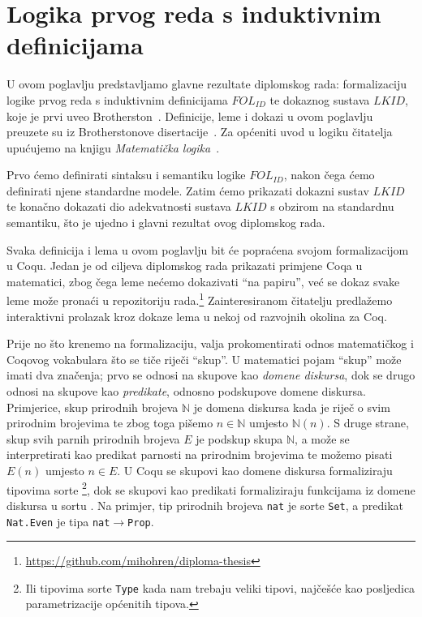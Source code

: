 \chapter{Logika prvog reda s induktivnim definicijama}\label{cha:logika-prvog-reda}
U ovom poglavlju predstavljamo glavne rezultate diplomskog rada: formalizaciju
logike prvog reda s induktivnim definicijama \(\mathit{FOL_{ID}}\)
te dokaznog sustava \(\mathit{LKID}\), koje je prvi uveo Brotherston~\cite{brotherston2005}.
Definicije, leme i dokazi u ovom poglavlju preuzete su iz Brotherstonove disertacije~\cite{brotherstonphd}.
Za općeniti uvod u logiku čitatelja upućujemo na knjigu \textit{Matematička logika}~\cite{vukovic}.

Prvo ćemo definirati sintaksu i semantiku logike \(\mathit{FOL_{ID}}\),
nakon čega ćemo definirati njene standardne modele.
Zatim ćemo prikazati dokazni sustav \(\mathit{LKID}\) te konačno dokazati dio adekvatnosti
sustava \(LKID\) s obzirom na standardnu semantiku,
što je ujedno i glavni rezultat ovog diplomskog rada.

Svaka definicija i lema u ovom poglavlju bit će popraćena svojom formalizacijom u Coqu.
Jedan je od ciljeva diplomskog rada prikazati primjene Coqa u matematici,
zbog čega leme nećemo dokazivati \enquote{na papiru},
već se dokaz svake leme može pronaći u repozitoriju rada.\footnote{\url{https://github.com/mihohren/diploma-thesis}}
Zainteresiranom čitatelju predlažemo interaktivni prolazak
kroz dokaze lema u nekoj od razvojnih okolina za Coq.

Prije no što krenemo na formalizaciju, valja prokomentirati odnos matematičkog i Coqovog vokabulara
što se tiče riječi \enquote{skup}.
U matematici pojam \enquote{skup} može imati dva značenja;
prvo se odnosi na skupove kao \textit{domene diskursa},
dok se drugo odnosi na skupove kao \textit{predikate}, odnosno podskupove domene diskursa.
Primjerice, skup prirodnih brojeva \(\mathbb{N}\) je domena diskursa kada je riječ o svim prirodnim brojevima
te zbog toga pišemo \(n \in \mathbb{N}\) umjesto \(\mathbb{N}(n)\).
S druge strane, skup svih parnih prirodnih brojeva \(E\) je podskup skupa \(\mathbb{N}\), a može se interpretirati
kao predikat parnosti na prirodnim brojevima te možemo pisati \(E(n)\) umjesto \(n \in E\).
U Coqu se skupovi kao domene diskursa formaliziraju tipovima sorte \coqset\footnote{Ili tipovima sorte \texttt{Type}
kada nam trebaju veliki tipovi, najčešće kao posljedica parametrizacije općenitih tipova.},
dok se skupovi kao predikati formaliziraju funkcijama iz domene diskursa u sortu \coqprop.
Na primjer, tip prirodnih brojeva \texttt{nat} je sorte \texttt{Set}, a predikat \texttt{Nat.Even} je tipa \texttt{nat\(\rightarrow\)Prop}.

